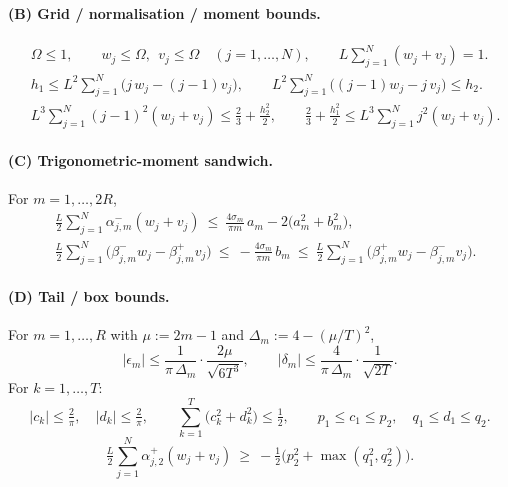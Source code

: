 \documentclass[11pt]{article}
\begin{document}
\paragraph{(B) Grid / normalisation / moment bounds.}
\begin{align}
&\Omega\le 1,\qquad w_j\le\Omega,\ \ v_j\le\Omega\quad(j=1,\dots,N),\qquad
  L\textstyle\sum_{j=1}^{N}(w_j+v_j)=1. \tag{E3}\\
&h_1\le L^2\!\sum_{j=1}^N\!\bigl(j\,w_j-(j-1)v_j\bigr),\qquad
  L^2\!\sum_{j=1}^N\!\bigl((j-1)w_j-j\,v_j\bigr)\le h_2. \tag{E4}\\
&L^3\!\sum_{j=1}^N (j-1)^2(w_j+v_j)\le \tfrac23+\tfrac{h_2^2}{2},\qquad
  \tfrac23+\tfrac{h_1^2}{2}\le L^3\!\sum_{j=1}^N j^2(w_j+v_j). \tag{E5}
\end{align}

\paragraph{(C) Trigonometric-moment sandwich.} For $m=1,\dots,2R$,
\begin{align}
&\tfrac{L}{2}\sum_{j=1}^N \alpha^{-}_{j,m}(w_j+v_j)
   \ \le\ \frac{4\sigma_m}{\pi m}\,a_m-2\bigl(a_m^2+b_m^2\bigr), \tag{E6}\\
&\tfrac{L}{2}\sum_{j=1}^N\bigl(\beta^{-}_{j,m}w_j-\beta^{+}_{j,m}v_j\bigr)
   \ \le\ -\frac{4\sigma_m}{\pi m}\,b_m
   \ \le\ \tfrac{L}{2}\sum_{j=1}^N\bigl(\beta^{+}_{j,m}w_j-\beta^{-}_{j,m}v_j\bigr). \tag{E7}
\end{align}

\paragraph{(D) Tail / box bounds.} For $m=1,\dots,R$ with $\mu:=2m-1$ and
$\Delta_m:=4-(\mu/T)^2$,
\begin{equation}
|\epsilon_m|\le \frac{1}{\pi\,\Delta_m}\cdot\frac{2\mu}{\sqrt{6T^3}},\qquad
|\delta_m|\le \frac{4}{\pi\,\Delta_m}\cdot\frac{1}{\sqrt{2T}}. \tag{E8}
\end{equation}
For $k=1,\dots,T$:
\begin{equation}
|c_k|\le\tfrac{2}{\pi},\quad |d_k|\le\tfrac{2}{\pi},\qquad
\sum_{k=1}^T\bigl(c_k^2+d_k^2\bigr)\le\tfrac12,\qquad
p_1\le c_1\le p_2,\quad q_1\le d_1\le q_2. \tag{E9}
\end{equation}
\begin{equation}
\tfrac{L}{2}\sum_{j=1}^N\alpha^{+}_{j,2}(w_j+v_j)\ \ge\ -\tfrac12\bigl(p_2^2+\max(q_1^2,q_2^2)\bigr). \tag{E10}
\end{equation}
\end{document}
